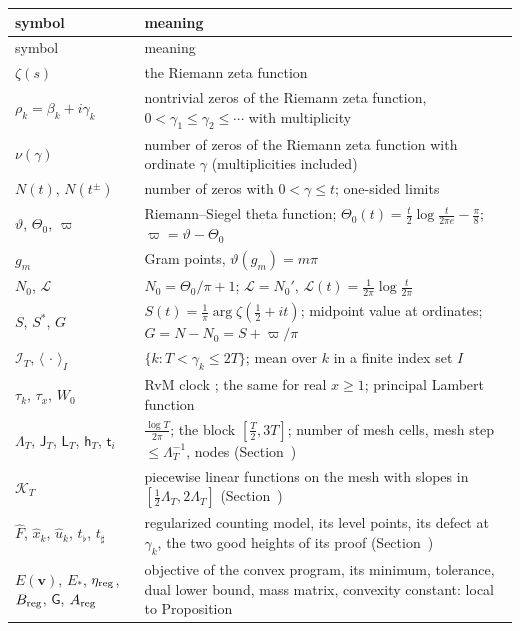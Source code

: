 \documentclass[preprint,12pt]{elsarticle}
\makeatletter
\let\CG@origref\ref
\let\CG@origeqref\eqref
\newcommand{\CG@gettip}[1]{\@ifundefined{CGTip@#1}{Reference: #1}{\csname CGTip@#1\endcsname}}
\DeclareRobustCommand{\CGref}[1]{\pdftooltip{\CG@origref{#1}}{\CG@gettip{#1}}}
\DeclareRobustCommand{\CGeqref}[1]{\pdftooltip{\CG@origeqref{#1}}{\CG@gettip{#1}}}
\numberwithin{equation}{section}
\theoremstyle{plain}
\theoremstyle{definition}
\theoremstyle{remark}
\newcommand{\NO}{N_0}
\newcommand{\lL}{\mathcal L}
\newcommand{\IT}{\mathcal I_T}
\makeatother
\begin{document}
\begin{center}
\small
\begin{longtable}{p{}p{}}
\toprule
symbol & meaning\\
\midrule
\endfirsthead
\toprule
symbol & meaning\\
\midrule
\endhead
\bottomrule
\endfoot
$\zeta(s)$ & the Riemann zeta function\\
$\rho_k=\beta_k+i\gamma_k$ & nontrivial zeros of the Riemann zeta function, $0<\gamma_1\le\gamma_2\le\cdots$ with multiplicity\\
$\nu(\gamma)$ & number of zeros of the Riemann zeta function with ordinate $\gamma$ (multiplicities included)\\
$N(t)$, $N(t^\pm)$ & number of zeros with $0<\gamma\le t$; one-sided limits\\
$\vartheta$, $\Theta_0$, $\varpi$ & Riemann--Siegel theta function; $\Theta_0(t)=\frac t2\log\frac t{2\pi e}-\frac\pi8$; $\varpi=\vartheta-\Theta_0$\\
$g_m$ & Gram points, $\vartheta(g_m)=m\pi$\\
$\NO$, $\lL$ & $\NO=\Theta_0/\pi+1$; $\lL=\NO'$, $\lL(t)=\frac1{2\pi}\log\frac t{2\pi}$\\
$S$, $S^*$, $G$ & $S(t)=\frac1\pi\arg\zeta(\frac12+it)$; midpoint value at ordinates; $G=N-\NO=S+\varpi/\pi$\\
$\IT$, $\langle\,\cdot\,\rangle_I$ & $\{k:T<\gamma_k\le2T\}$; mean over $k$ in a finite index set $I$\\
$\tau_k$, $\tau_x$, $W_0$ & RvM clock \CGeqref{eq:clock}; the same for real $x\ge1$; principal Lambert function\\
$\Lambda_T$, $\mathsf J_T$, $\mathsf L_T$, $\mathsf h_T$, $\mathsf t_i$ & $\frac{\log T}{2\pi}$; the block $[\frac T2,3T]$; number of mesh cells, mesh step $\le\Lambda_T^{-1}$, nodes (Section~\CGref{sec:regularized})\\
$\mathcal K_T$ & piecewise linear functions on the mesh with slopes in $[\frac12\Lambda_T,2\Lambda_T]$ (Section~\CGref{sec:regularized})\\
$\widehat F$, $\widehat x_k$, $\widehat u_k$, $t_\flat$, $t_\sharp$ & regularized counting model, its level points, its defect at $\gamma_k$, the two good heights of its proof (Section~\CGref{sec:regularized})\\
$E(\mathbf v)$, $E_*$, $\eta_{\rm reg}$, $B_{\rm reg}$, $\mathsf G$, $A_{\rm reg}$ & objective of the convex program, its minimum, tolerance, dual lower bound, mass matrix, convexity constant: local to Proposition~\CGref{prop:tolerance}\\

\end{longtable}
\end{center}
\end{document}
